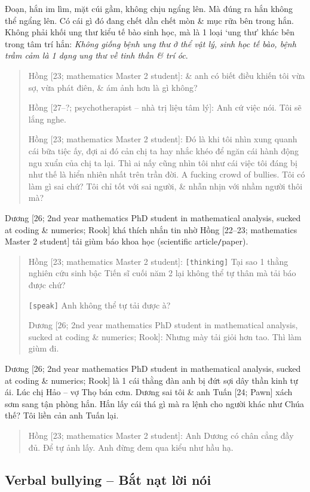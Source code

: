 \documentclass[12pt,oneside]{book}
\begin{document}
Đoạn, hắn im lìm, mặt cúi gầm, không chịu ngẩng lên. Mà đúng ra hắn không thể ngẩng lên. Có cái gì đó đang chết dần chết mòn \& mục rữa bên trong hắn. Không phải khối ung thư kiểu tế bào sinh học, mà là 1 loại `ung thư' khác bên trong tâm trí hắn: {\it Không giống bệnh ung thư ở thể vật lý, sinh học tế bào, bệnh trầm cảm là 1 dạng ung thư về tinh thần \& trí óc}.
\begin{quote}
	{\sf Hồng [23; mathematics Master 2 student]}: \& anh có biết điều khiến tôi vừa sợ, vừa phát điên, \& ám ảnh hơn là gì không?
	
	{\sf Hồng [27--?; psychotherapist -- nhà trị liệu tâm lý]}: Anh cứ việc nói. Tôi sẽ lắng nghe.
	
	{\sf Hồng [23; mathematics Master 2 student]}: Đó là khi tôi nhìn xung quanh cái bữa tiệc ấy, đợi ai đó cản chị ta hay nhắc khéo để ngăn cái hành động ngu xuẩn của chị ta lại. Thì ai nấy cũng nhìn tôi như cái việc tôi đáng bị như thế là hiển nhiên nhất trên trần đời. A fucking crowd of bullies. Tôi có làm gì sai chứ? Tôi chỉ tốt với sai người, \& nhẫn nhịn với nhầm người thôi mà?
\end{quote}
{\sf Dương [26; 2nd year mathematics PhD student in mathematical analysis, sucked at coding \& numerics; Rook]} khá thích nhắn tin nhờ {\sf Hồng [22--23; mathematics Master 2 student]} tải giùm báo khoa học (scientific article{\tt/}paper).
\begin{quote}
	{\sf Hồng [23; mathematics Master 2 student]}: {\tt[thinking]} Tại sao 1 thằng nghiên cứu sinh bậc Tiến sĩ cuối năm 2 lại không thể tự thân mà tải báo được chứ?
	
	{\tt[speak]} Anh không thể tự tải được à?
	
	{\sf Dương [26; 2nd year mathematics PhD student in mathematical analysis, sucked at coding \& numerics; Rook]}: Nhưng mày tải giỏi hơn tao. Thì làm giùm đi.
\end{quote}
{\sf Dương [26; 2nd year mathematics PhD student in mathematical analysis, sucked at coding \& numerics; Rook]} là 1 cái thằng đàn anh bị đứt sợi dây thần kinh tự ái. Lúc chị Hảo -- vợ Thọ bán cơm. Dương sai tôi \& anh {\sf Tuấn [24; Pawn]} xách sơm sang tận phòng hắn. Hắn lấy cái thá gì mà ra lệnh cho người khác như Chúa thế? Tôi liền cản anh Tuấn lại.
\begin{quote}
	{\sf Hồng [23; mathematics Master 2 student]}: Anh Dương có chân cẳng đầy đủ. Để tự ảnh lấy. Anh đừng đem qua kiểu như hầu hạ.
\end{quote}

\subsection{Verbal bullying -- Bắt nạt lời nói}
\end{document}

